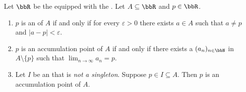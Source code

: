 \begin{lemma} \label{lemma:point_in_subset_of_real_numbers_is_accumulation_point_if_and_only_if_there_exists_a_convergent_sequence_in_the_complement_whose_limit_is_the_point}
    Let $\bbR$ be the  equipped with the . Let $A \subseteq \bbR$ and $p \in \bbR$.

    \begin{enumerate}
        \item $p$ is an  of $A$ if and only if for every $\varepsilon > 0$ there exists $a \in A$ such that $a \neq p$ and $|a - p| < \varepsilon$.
        \item $p$ is an accumulation point of $A$ if and only if there exists a  $(a_n)_{n \in \bbN}$ in $A \setminus \{p\}$ such that $\lim_{n \to \infty} a_n = p$.
        \item Let $I$ be an  that is \emph{not a singleton}. Suppose $p \in I \subseteq A$. Then $p$ is an accumulation point of $A$.
    \end{enumerate}
\end{lemma}
